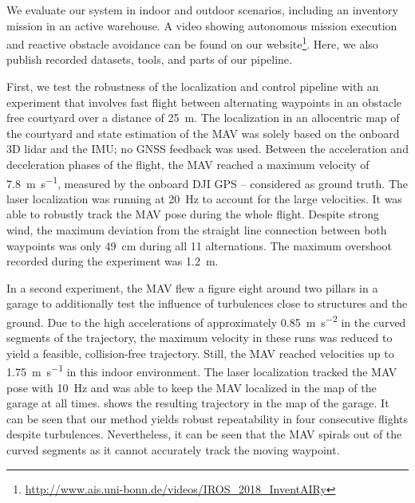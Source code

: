 We evaluate our system in indoor and outdoor scenarios, including an inventory mission in an active warehouse. A video showing autonomous mission execution and reactive obstacle avoidance can be found on our website\footnote{\scriptsize{\url{http://www.ais.uni-bonn.de/videos/IROS_2018_InventAIRy}}}. Here, we also publish recorded datasets, tools, and parts of our pipeline.

First, we test the robustness of the localization and control pipeline with an experiment that involves fast flight between alternating waypoints in an obstacle free courtyard over a distance of \SI{25}{\meter}.
The localization in an allocentric map of the courtyard and state estimation of the MAV was solely based on the onboard 3D lidar and the IMU; no GNSS feedback was used.
Between the acceleration and deceleration phases of the flight, the MAV reached a maximum velocity of \SI{7.8}{\meter\per\second}, measured by the onboard DJI GPS -- considered as ground truth.
The laser localization was running at \SI{20}{\hertz} to account for the large velocities. It was able to robustly track the MAV pose during the whole flight.
Despite strong wind, the maximum deviation from the straight line connection between both waypoints was only \SI{49}{\centi\meter} during all 11 alternations. The maximum overshoot recorded during the experiment was \SI{1.2}{\meter}.

In a second experiment, the MAV flew a figure eight around two pillars in a garage to additionally test the influence of turbulences close to structures and the ground.
Due to the high accelerations of approximately \SI{0.85}{\meter\per\second\squared} in the curved segments of the trajectory, the maximum velocity in these runs was reduced to yield a feasible, collision-free trajectory.
Still, the MAV reached velocities up to \SI{1.75}{\meter\per\second} in this indoor environment.
The laser localization tracked the MAV pose with \SI{10}{\hertz} and was able to keep the MAV localized in the map of the garage at all times.
 shows the resulting trajectory in the map of the garage. It can be seen that our method yields robust repeatability in four consecutive flights despite turbulences.
Nevertheless, it can be seen that the MAV spirals out of the curved segments as it cannot accurately track the moving waypoint.

